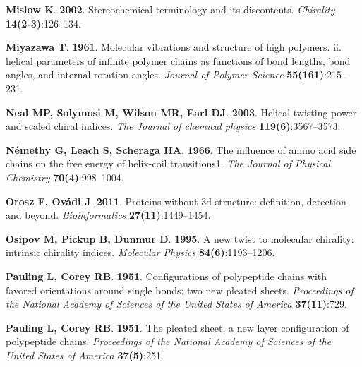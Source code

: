 \documentclass[fleqn,10pt,lineno]{wlpeerj} %
\begin{document}
\begin{thebibliography}{58}
\textbf{Mislow K}. \textbf{2002}.
\newblock Stereochemical terminology and its discontents.
\newblock \emph{Chirality} \textbf{14(2-3)}:126--134.

\textbf{Miyazawa T}. \textbf{1961}.
\newblock Molecular vibrations and structure of high polymers. ii. helical
  parameters of infinite polymer chains as functions of bond lengths, bond
  angles, and internal rotation angles.
\newblock \emph{Journal of Polymer Science} \textbf{55(161)}:215--231.

\textbf{Neal MP, Solymosi M, Wilson MR, Earl DJ}. \textbf{2003}.
\newblock Helical twisting power and scaled chiral indices.
\newblock \emph{The Journal of chemical physics} \textbf{119(6)}:3567--3573.

\textbf{N{\'e}methy G, Leach S, Scheraga HA}. \textbf{1966}.
\newblock The influence of amino acid side chains on the free energy of
  helix-coil transitions1.
\newblock \emph{The Journal of Physical Chemistry} \textbf{70(4)}:998--1004.

\textbf{Orosz F, Ov{\'a}di J}. \textbf{2011}.
\newblock Proteins without 3d structure: definition, detection and beyond.
\newblock \emph{Bioinformatics} \textbf{27(11)}:1449--1454.

\textbf{Osipov M, Pickup B, Dunmur D}. \textbf{1995}.
\newblock A new twist to molecular chirality: intrinsic chirality indices.
\newblock \emph{Molecular Physics} \textbf{84(6)}:1193--1206.

\textbf{Pauling L, Corey RB}. \textbf{1951}{}.
\newblock Configurations of polypeptide chains with favored orientations around
  single bonds: two new pleated sheets.
\newblock \emph{Proceedings of the National Academy of Sciences of the United
  States of America} \textbf{37(11)}:729.

\textbf{Pauling L, Corey RB}. \textbf{1951}{}.
\newblock The pleated sheet, a new layer configuration of polypeptide chains.
\newblock \emph{Proceedings of the National Academy of Sciences of the United
  States of America} \textbf{37(5)}:251.


\end{thebibliography}
\end{document}
